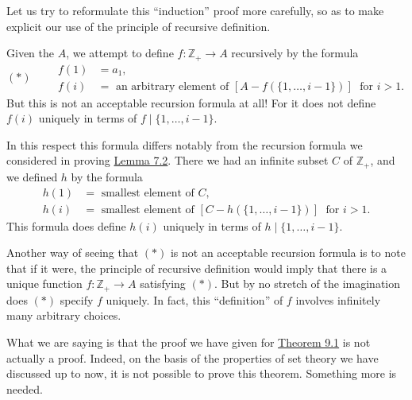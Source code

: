 Let us try to reformulate this ``induction'' proof more carefully, so as to make explicit our use of the principle of recursive definition.

Given the  \(A\), we attempt to define \(f : \mathbb{Z}_{+} \rightarrow A\) recursively by the formula
\[
(*) \qquad
\begin{aligned}
f(1) &= a_{1}, \\
f(i) &= \text{ an arbitrary element of }[{A - f({\{1,\ldots, i - 1\} }) }] \;\text{ for }i > 1\text{.}
\end{aligned}
\]
But this is not an acceptable recursion formula at all! For it does not define \(f(i)\) uniquely in terms of \(f \mid \{1,\ldots, i - 1\}\).

In this respect this formula differs notably from the recursion formula we considered in proving \hyperref[lem:7.2]{Lemma 7.2}. There we had an infinite subset \(C\) of \(\mathbb{Z}_{+}\), and we defined \(h\) by the formula
\[
\begin{aligned}
h(1) &= \text{ smallest element of }C\text{, } \\
h(i) &= \text{ smallest element of }[{C - h({\{1,\ldots, i - 1\} }) }] \;\text{ for }i > 1\text{.}
\end{aligned}
\]
This formula does define \(h(i)\) uniquely in terms of \(h \mid \{1,\ldots, i - 1\}\).

Another way of seeing that \((*)\) is not an acceptable recursion formula is to 
note that if it were, the principle of recursive definition would imply that 
there is a unique function \(f : \mathbb{Z}_{+} \rightarrow A\) satisfying \((*)\). 
But by no stretch of the imagination does \((*)\) specify \(f\) uniquely. In fact, this ``definition'' of \(f\) involves infinitely many arbitrary choices.

What we are saying is that the proof we have given for \hyperref[thm:9.1]{Theorem 9.1} is not actually 
a proof. Indeed, on the basis of the properties of set theory we have discussed up to now, 
it is not possible to prove this theorem. Something more is needed.

